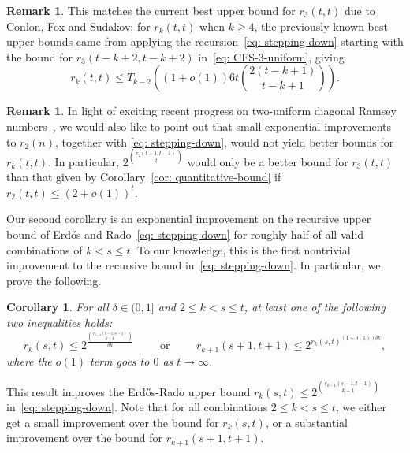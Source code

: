 \documentclass[A4paper,reqno,oneside,12pt]{amsart}
\theoremstyle{plain}
\newtheorem{corollary}[theorem]{Corollary}
\theoremstyle{definition}
\newtheorem{remark}[theorem]{Remark}
\def\d{\delta}
\begin{document}
\begin{remark}
    This matches the current best upper bound for $r_3(t,t)$ due to Conlon, Fox and Sudakov; for $r_k(t,t)$ when $k \geq 4$, the previously known best upper bounds came from applying the recursion~\eqref{eq: stepping-down} starting with the bound for $r_3(t-k+2,t-k+2)$ in~\eqref{eq: CFS-3-uniform}, giving
    \begin{equation*}
        r_k(t,t) \leq T_{k-2}\left((1+o(1))6t\binom{2(t-k+1)}{t-k+1}\right).
    \end{equation*}
\end{remark}

\begin{remark}
    In light of exciting recent progress on two-uniform diagonal Ramsey numbers~\cite{BBC+, CGMS}, we would also like to point out that 
    small exponential improvements to $r_2(n)$, together with \eqref{eq: stepping-down}, would not yield better bounds for $r_k(t,t)$. 
    In particular, $2^{\binom{r_2(t-1,t-1)}{2}}$ would only be a better bound for $r_3(t,t)$ than that given by Corollary~\ref{cor: quantitative-bound} if $r_2(t,t) \leq (2+o(1))^t$.
\end{remark}

Our second corollary is an exponential improvement on the recursive upper bound of Erd\H{o}s and Rado~\eqref{eq: stepping-down} for roughly half of all valid combinations of $k < s \leq t$.
To our knowledge, this is the first nontrivial improvement to the recursive bound in~\eqref{eq: stepping-down}.
In particular, we prove the following.

\begin{corollary}
\label{cor: recursive-improvement}
    For all $\d \in (0,1]$ and $2 \leq k < s \le t$, at least one of the following two inequalities holds:
    \begin{equation*}
        r_k(s,t) \leq 2^{\frac{\binom{r_{k-1}(t-1,s-1)}{k-1}}{\delta k}}
        \hspace{1cm}
        \text{or}
        \hspace{1cm}
        r_{k+1}(s+1, t+1) \leq 2^{r_k(s, t)^{(1+o(1))\delta k}},
    \end{equation*}
    where the $o(1)$ term goes to $0$ as $t\to \infty$.
\end{corollary}

This result improves the Erd\H{o}s-Rado upper bound $r_k(s,t) \leq 2^{\binom{r_{k-1}(s-1,t-1)}{k-1}}$ in~\eqref{eq: stepping-down}.
Note that for all combinations $2 \leq k < s \leq t$, we either get a small improvement over the bound for $r_k(s,t)$, or a substantial improvement over the bound for $r_{k+1}(s+1, t+1)$.
\end{document}
